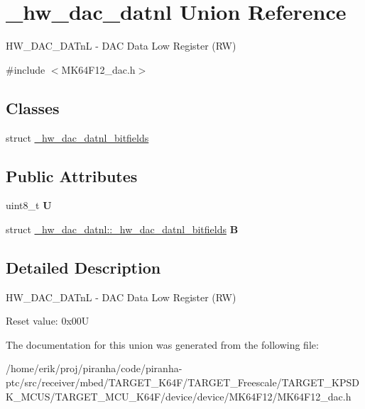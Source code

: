 \hypertarget{union__hw__dac__datnl}{}\section{\+\_\+hw\+\_\+dac\+\_\+datnl Union Reference}
\label{union__hw__dac__datnl}


H\+W\+\_\+\+D\+A\+C\+\_\+\+D\+A\+TnL -\/ D\+AC Data Low Register (RW)  




{\ttfamily \#include $<$M\+K64\+F12\+\_\+dac.\+h$>$}

\subsection*{Classes}
\begin{DoxyCompactItemize}
\item 
struct \hyperlink{struct__hw__dac__datnl_1_1__hw__dac__datnl__bitfields}{\+\_\+hw\+\_\+dac\+\_\+datnl\+\_\+bitfields}
\end{DoxyCompactItemize}
\subsection*{Public Attributes}
\begin{DoxyCompactItemize}
\item 
uint8\+\_\+t {\bfseries U}\hypertarget{union__hw__dac__datnl_a24ad117591d0c3932baf6cb4208ca66b}{}\label{union__hw__dac__datnl_a24ad117591d0c3932baf6cb4208ca66b}

\item 
struct \hyperlink{struct__hw__dac__datnl_1_1__hw__dac__datnl__bitfields}{\+\_\+hw\+\_\+dac\+\_\+datnl\+::\+\_\+hw\+\_\+dac\+\_\+datnl\+\_\+bitfields} {\bfseries B}\hypertarget{union__hw__dac__datnl_ab3fd077cc31cccfbda6e6944453134d2}{}\label{union__hw__dac__datnl_ab3fd077cc31cccfbda6e6944453134d2}

\end{DoxyCompactItemize}


\subsection{Detailed Description}
H\+W\+\_\+\+D\+A\+C\+\_\+\+D\+A\+TnL -\/ D\+AC Data Low Register (RW) 

Reset value\+: 0x00U 

The documentation for this union was generated from the following file\+:\begin{DoxyCompactItemize}
\item 
/home/erik/proj/piranha/code/piranha-\/ptc/src/receiver/mbed/\+T\+A\+R\+G\+E\+T\+\_\+\+K64\+F/\+T\+A\+R\+G\+E\+T\+\_\+\+Freescale/\+T\+A\+R\+G\+E\+T\+\_\+\+K\+P\+S\+D\+K\+\_\+\+M\+C\+U\+S/\+T\+A\+R\+G\+E\+T\+\_\+\+M\+C\+U\+\_\+\+K64\+F/device/device/\+M\+K64\+F12/M\+K64\+F12\+\_\+dac.\+h\end{DoxyCompactItemize}
